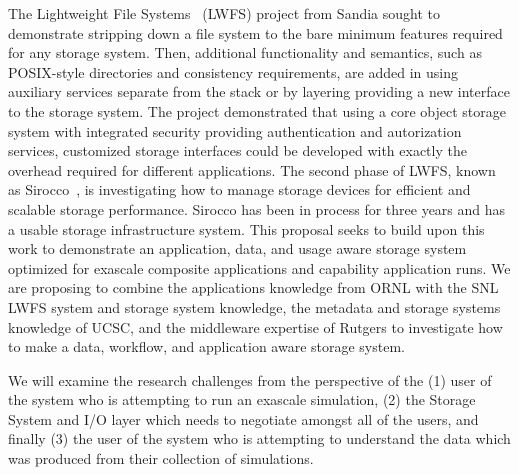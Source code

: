 The Lightweight File Systems~\cite{lwfs} (LWFS) project from Sandia sought to
demonstrate stripping down a file system to the bare minimum features required
for any storage system. Then, additional functionality and semantics, such as
POSIX-style directories and consistency requirements, are added in using
auxiliary services separate from the stack or by layering providing a new
interface to the storage system. The project demonstrated that using a core
object storage system with integrated security providing authentication and
autorization services, customized storage interfaces could be developed with
exactly the overhead required for different applications. The second phase of
LWFS, known as Sirocco~\cite{sirocco}, is investigating how to manage storage
devices for efficient and scalable storage performance.  Sirocco has been in
process for three years and has a usable storage infrastructure system. This
proposal seeks to build upon this work to demonstrate an application, data, and
usage aware storage system optimized for exascale composite applications and
capability application runs. We are proposing to combine the applications
knowledge from ORNL with the SNL LWFS system and storage system knowledge, the
metadata and storage systems knowledge of UCSC, and the middleware expertise of
Rutgers to investigate how to make a data, workflow, and application aware
storage system.

We will examine the research challenges from the perspective of the (1) user of the system who is attempting to run an exascale simulation,
(2) the Storage System and I/O layer which needs to negotiate amongst all of the users, and finally (3) the user of the system who is attempting to
understand the data which was produced from their collection of simulations.

